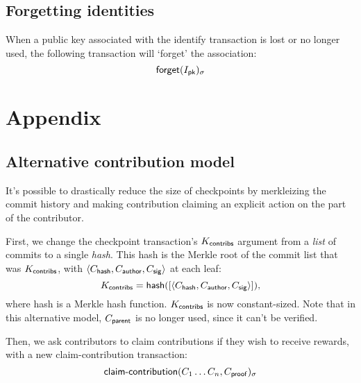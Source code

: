 \subsection{Forgetting identities}
When a public key associated with the \textsf{identify} transaction is lost or no
longer used, the following transaction will `forget' the association:
\[
    \operatorname{\mathsf{forget}}\lparen I_{\mathsf{pk}}\rparen_\sigma
\]

\appendix
\section*{Appendix}

\subsection*{Alternative contribution model}
It's possible to drastically reduce the size of checkpoints by merkleizing the commit
history and making contribution claiming an explicit action on the part of
the contributor.

First, we change the checkpoint transaction's $K_{\mathsf{contribs}}$ argument from a \emph{list}
of commits to a single \emph{hash}. This hash is the Merkle root of the commit list
that was $K_{\mathsf{contribs}}$, with $\langle C_{\mathsf{hash}}, C_{\mathsf{author}}, C_{\mathsf{sig}}\rangle$ at each leaf:
\[
    K_{\mathsf{contribs}} = \operatorname{\mathsf{hash}}(
        [\langle C_{\mathsf{hash}}, C_{\mathsf{author}}, C_{\mathsf{sig}}\rangle]
    ),
\]
where \textsf{hash} is a Merkle hash function. $K_{\mathsf{contribs}}$ is
now constant-sized. Note that in this alternative model, $C_{\mathsf{parent}}$ is
no longer used, since it can't be verified.

Then, we ask contributors to claim contributions if they wish to receive rewards, with
a new \textsf{claim-contribution} transaction:
\[
    \operatorname{\mathsf{claim-contribution}}\lparen C_1 \dots C_n, C_{\mathsf{proof}}\rparen_\sigma
\]

